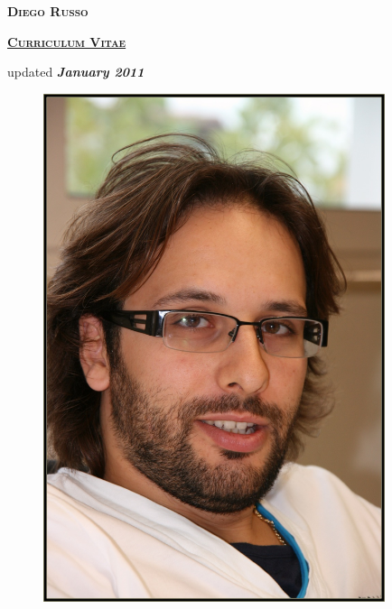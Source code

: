 \documentclass[totpages,helvetica,openbib,english]{europecv}
\begin{document}
    \begin{center}
        \hspace{1pt}
        \vspace{2cm}
    
        {\scshape \textbf{\Huge Diego Russo}}
    
        \vspace{1cm}
    
        {\scshape \textbf{\Large \underline{Curriculum Vitae}}}
    
        \vspace{0.25cm}
    
        {\large updated \emph{\textbf{January 2011}}}
        
        \vspace{2cm}
        
        \begin{figure}[htbp] 
            \begin{center} 
                \includegraphics[width=10cm]{io.jpg}
            \end{center} 
        \end{figure}
        
    \end{center}
\pagebreak
{}
\end{document}
